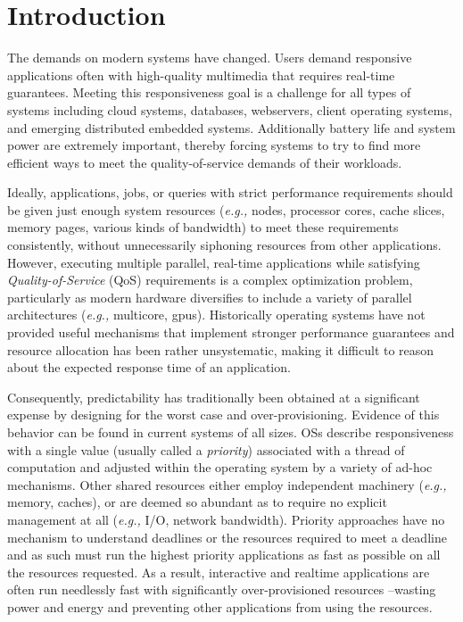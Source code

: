 \section{Introduction}


The demands on modern systems have changed.  Users demand responsive applications often with high-quality multimedia that requires real-time guarantees.  Meeting this responsiveness goal is a challenge for all types of systems including cloud systems, databases, webservers, client operating systems, and emerging distributed embedded systems. Additionally battery life and system power are extremely important, thereby forcing systems to try to find more efficient ways to meet the quality-of-service demands of their workloads.

Ideally, applications, jobs, or queries with strict performance requirements should be given just enough system resources (\emph{e.g.,} nodes, processor cores, cache slices, memory pages, various kinds of bandwidth) to meet these requirements consistently, without unnecessarily siphoning resources from other applications. However, executing multiple parallel, real-time applications while satisfying  \emph{Quality-of-Service} (QoS) requirements is a complex optimization problem, particularly as modern hardware diversifies to include a variety of parallel architectures (\emph{e.g.,} multicore, gpus).  Historically operating systems have not provided useful mechanisms that implement stronger performance guarantees and resource allocation has been rather unsystematic, making it difficult to reason about the expected response time of an application. 

Consequently, predictability has traditionally been obtained at a significant expense by designing for the worst case and over-provisioning.  Evidence of this behavior can be found in current systems of all sizes.  OSs describe responsiveness with a single value (usually called a \emph{priority}) associated with a thread of computation and adjusted within the operating system by a variety of ad-hoc mechanisms. Other shared resources either employ independent machinery (\emph{e.g.,} memory, caches), or are deemed so abundant as to require no explicit management at all (\emph{e.g.,} I/O, network bandwidth).
 Priority approaches have no mechanism to understand deadlines or the resources required to meet a deadline and as such must run the highest priority applications as fast as possible on all the resources requested.   As a result, interactive and realtime applications are often run needlessly fast with significantly over-provisioned resources --wasting power and energy and preventing other applications from using the resources.  

